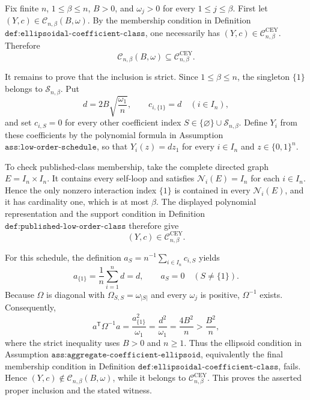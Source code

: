 Fix finite \(n\), \(1\le\beta\le n\), \(B>0\), and \(\omega_j>0\) for every \(1\le j\le\beta\). First let \((Y,c)\in\mathcal C_{n,\beta}(B,\omega)\). By the membership condition in Definition \(\texttt{def:ellipsoidal-coefficient-class}\), one necessarily has \((Y,c)\in\mathcal C^{\mathrm{CEY}}_{n,\beta}\). Therefore
\[
\mathcal C_{n,\beta}(B,\omega)\subseteq\mathcal C^{\mathrm{CEY}}_{n,\beta}.
\]

It remains to prove that the inclusion is strict. Since \(1\le\beta\le n\), the singleton \(\{1\}\) belongs to \(\mathcal S_{n,\beta}\). Put
\[
d=2B\sqrt{\frac{\omega_1}{n}},
\qquad
c_{i,\{1\}}=d
\quad(i\in I_n),
\]
and set \(c_{i,S}=0\) for every other coefficient index \(S\in\{\varnothing\}\cup\mathcal S_{n,\beta}\). Define \(Y_i\) from these coefficients by the polynomial formula in Assumption \(\texttt{ass:low-order-schedule}\), so that \(Y_i(z)=d z_1\) for every \(i\in I_n\) and \(z\in\{0,1\}^n\).

To check published-class membership, take the complete directed graph \(E=I_n\times I_n\). It contains every self-loop and satisfies \(\mathcal N_i(E)=I_n\) for each \(i\in I_n\). Hence the only nonzero interaction index \(\{1\}\) is contained in every \(\mathcal N_i(E)\), and it has cardinality one, which is at most \(\beta\). The displayed polynomial representation and the support condition in Definition \(\texttt{def:published-low-order-class}\) therefore give
\[
(Y,c)\in\mathcal C^{\mathrm{CEY}}_{n,\beta}.
\]

For this schedule, the definition \(a_S=n^{-1}\sum_{i\in I_n}c_{i,S}\) yields
\[
a_{\{1\}}
=\frac1n\sum_{i=1}^n d
=d,
\qquad
a_S=0
\quad(S\ne\{1\}).
\]
Because \(\Omega\) is diagonal with \(\Omega_{S,S}=\omega_{|S|}\) and every \(\omega_j\) is positive, \(\Omega^{-1}\) exists. Consequently,
\[
a^{\mathsf T}\Omega^{-1}a
=\frac{a_{\{1\}}^2}{\omega_1}
=\frac{d^2}{\omega_1}
=\frac{4B^2}{n}
>\frac{B^2}{n},
\]
where the strict inequality uses \(B>0\) and \(n\ge1\). Thus the ellipsoid condition in Assumption \(\texttt{ass:aggregate-coefficient-ellipsoid}\), equivalently the final membership condition in Definition \(\texttt{def:ellipsoidal-coefficient-class}\), fails. Hence \((Y,c)\notin\mathcal C_{n,\beta}(B,\omega)\), while it belongs to \(\mathcal C^{\mathrm{CEY}}_{n,\beta}\). This proves the asserted proper inclusion and the stated witness.